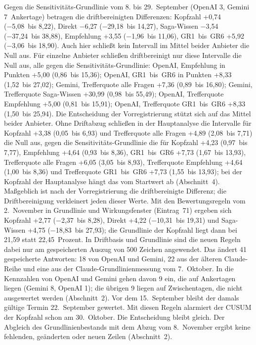 \documentclass[11pt]{article}
\begin{document}
Gegen die Sensitivitäts-Grundlinie vom 8. bis 29.~September (OpenAI 3, Gemini 7~Ankertage) betragen die driftbereinigten Differenzen: Kopfzahl +0,74 (−5,08~bis 8,22), Direkt −6,27 (−29,18~bis 14,27), Saga-Wissen −3,54 (−37,24~bis 38,88), Empfehlung +3,55 (−1,96~bis 11,06), GR1~bis~GR6 +5,92 (−3,06~bis 18,90). Auch hier schließt kein Intervall im Mittel beider Anbieter die Null aus. Für einzelne Anbieter schließen driftbereinigt nur diese Intervalle die Null aus, alle gegen die Sensitivitäts-Grundlinie: OpenAI, Empfehlung in Punkten +5,00 (0,86~bis 15,36); OpenAI, GR1~bis~GR6 in Punkten +8,33 (1,52~bis 27,02); Gemini, Trefferquote alle Fragen +7,36 (0,89~bis 16,80); Gemini, Trefferquote Saga-Wissen +30,99 (0,98~bis 55,49); OpenAI, Trefferquote Empfehlung +5,00 (0,81~bis 15,91); OpenAI, Trefferquote GR1~bis~GR6 +8,33 (1,50~bis 25,94). Die Entscheidung der Vorregistrierung stützt sich auf das Mittel beider Anbieter. Ohne Driftabzug schließen in der Hauptanalyse die Intervalle für Kopfzahl +3,38 (0,05~bis 6,93) und Trefferquote alle Fragen +4,89 (2,08~bis 7,71) die Null aus, gegen die Sensitivitäts-Grundlinie die für Kopfzahl +4,23 (0,97~bis 7,77), Empfehlung +4,64 (0,93~bis 8,36), GR1~bis~GR6 +7,73 (1,67~bis 13,93), Trefferquote alle Fragen +6,05 (3,05~bis 8,93), Trefferquote Empfehlung +4,64 (1,00~bis 8,36) und Trefferquote GR1~bis~GR6 +7,73 (1,55~bis 13,93); bei der Kopfzahl der Hauptanalyse hängt das vom Startwert ab (Abschnitt~4). Maßgeblich ist nach der Vorregistrierung die driftbereinigte Differenz; die Driftbereinigung verkleinert jeden dieser Werte. Mit den Bewertungsregeln vom 2.~November in Grundlinie und Wirkungsfenster (Eintrag~71) ergeben sich Kopfzahl +2,77 (−2,37~bis 8,28), Direkt +4,22 (−10,31~bis 19,31) und Saga-Wissen +4,75 (−18,83~bis 27,93); die Grundlinie der Kopfzahl liegt dann bei 21,59 statt 22,45~Prozent. In Driftbasis und Grundlinie sind die neuen Regeln dabei nur am gespeicherten Auszug von 500 Zeichen angewendet. Das ändert 41 gespeicherte Antworten: 18 von OpenAI und Gemini, 22 aus der älteren Claude-Reihe und eine aus der Claude-Grundlinienmessung vom 7.~Oktober. In die Kennzahlen von OpenAI und Gemini gehen davon 9 ein, die auf Ankertagen liegen (Gemini 8, OpenAI 1); die übrigen 9 liegen auf Zwischentagen, die nicht ausgewertet werden (Abschnitt~2). Vor dem 15.~September bleibt der damals gültige Termin 22.~September gewertet. Mit diesen Regeln alarmiert der CUSUM der Kopfzahl schon am 30.~Oktober. Die Entscheidung bleibt gleich. Der Abgleich des Grundlinienbestands mit dem Abzug vom 8.~November ergibt keine fehlenden, geänderten oder neuen Zeilen (Abschnitt~2).
\end{document}
